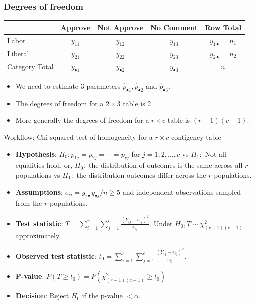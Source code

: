 \documentclass[a4paper]{article}\usepackage[]{graphicx}\usepackage[]{xcolor}
\begin{document}
\subsubsection{Degrees of freedom}
\begin{table}[H]
	\centering
	\begin{tabular}{@{}lcccc@{}}
	\toprule
				   & Approve  			 & Not Approve 		   & No Comment			 & Row Total                 \\ \midrule
	Labor   	   & \( y_{11} \)		 & \( y_{12} \) 	   & \( y_{13} \) 		 & \( y_{1 \bullet} = n_1 \) \\
	Liberal   	   & \( y_{21} \) 		 & \( y_{22} \) 	   & \( y_{23} \) 		 & \( y_{2 \bullet} = n_2 \) \\ \midrule
	Category Total & \( y_{\bullet 1} \) & \( y_{\bullet 2} \) & \( y_{\bullet 3} \) & \( n \) 				 \\ \bottomrule
	\end{tabular}
\end{table}
\begin{itemize}
	\item We need to estimate 3 parameters \( \hat{p}_{\bullet 1},\hat{p}_{\bullet 2} \) and \( \hat{p}_{\bullet 3} \).
	\item The degrees of freedom for a \( 2 \times 3 \) table is 2
	\item More generally the degrees of freedom for a \( r \times c \) table is \( (r-1)(c-1) \).
\end{itemize}
\begin{redbox}{Workflow: Chi-squared test of homogeneity for a \( r \times c \) contigency table}
	\begin{itemize}
		\item \textbf{Hypothesis}: \( H_0: p_{1j} = p_{2j} = \dotsb = p_{rj} \) for \( j = 1,2,\dotsc,c \) vs \( H_1: \) Not all equalities hold, or, \( H_0: \) the distribution of outcomes is the same across all \( r \) populations vs \( H_1: \) the distribution outcomes differ across the \( r \) populations. 
		\item \textbf{Assumptions}: \( e_{ij} =y_{i \bullet} y_{\bullet j}/n \geq 5 \) and independent observations sampled from the \( r \) populations.
		\item \textbf{Test statistic}: \( T = \sum\limits_{i=1}^{r}\sum\limits_{j=1}^{c} \frac{(Y_{ij} - e_{ij})^2}{e_{ij}} \). Under \( H_0, T \sim \chi^2_{(r-1)(c-1)} \) approximately.
		\item \textbf{Observed test statistic}: \( t_0 = \sum\limits_{i=1}^{r}\sum\limits_{j=1}^{c} \frac{(Y_{ij} - e_{ij})^2}{e_{ij}} \).
		\item \textbf{P-value}: \( P(T\geq t_0) = P(\chi^2_{(r-1)(c-1)} \geq t_0) \)
		\item \textbf{Decision}: Reject \( H_0 \) if the p-value \( < \alpha \).
	\end{itemize}
\end{redbox}
\end{document}
